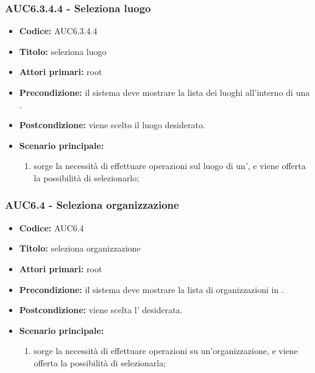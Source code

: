 \documentclass[casi-duso]{subfiles}
\begin{document}
\subsubsection{AUC6.3.4.4 - Seleziona luogo}%
\label{subsub:AUC6.3.4.4}
\begin{itemize}
  \item \textbf{Codice:} AUC6.3.4.4
  \item \textbf{Titolo:} seleziona luogo
  \item \textbf{Attori primari:} root
  \item \textbf{Precondizione:} il sistema deve mostrare la lista dei luoghi all'interno di una .
  \item \textbf{Postcondizione:} viene scelto il luogo desiderato.
  \item \textbf{Scenario principale:}
  \begin{enumerate}
    \item sorge la necessità di effettuare operazioni sul luogo di un', e viene offerta la possibilità di selezionarlo;
  \end{enumerate}
\end{itemize}

\subsubsection{AUC6.4 - Seleziona organizzazione}%
\label{subsub:AUC6.4}
\begin{itemize}
  \item \textbf{Codice:} AUC6.4
  \item \textbf{Titolo:} seleziona organizzazione
  \item \textbf{Attori primari:} root
  \item \textbf{Precondizione:} il sistema deve mostrare la lista di organizzazioni in .
  \item \textbf{Postcondizione:} viene scelta l' desiderata.
  \item \textbf{Scenario principale:}
  \begin{enumerate}
    \item sorge la necessità di effettuare operazioni su un'organizzazione, e viene offerta la possibilità di selezionarla;
  \end{enumerate}
\end{itemize}
\end{document}
